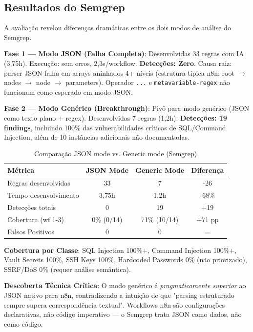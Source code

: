 \documentclass[12pt,a4paper]{article}
\begin{document}
\subsection{Resultados do Semgrep}

A avaliação revelou diferenças dramáticas entre os dois modos de análise do Semgrep.

\textbf{Fase 1 — Modo JSON (Falha Completa)}: Desenvolvidas 33 regras com IA (3,75h). Execução: sem erros, 2,3s/workflow. \textbf{Detecções: Zero}. Causa raiz: parser JSON falha em arrays aninhados 4+ níveis (estrutura típica n8n: root $\rightarrow$ nodes $\rightarrow$ node $\rightarrow$ parameters). Operador \texttt{...} e \texttt{metavariable-regex} não funcionam como esperado em modo JSON.

\textbf{Fase 2 — Modo Genérico (Breakthrough)}: Pivô para modo genérico (JSON como texto plano + regex). Desenvolvidas 7 regras (1,2h). \textbf{Detecções: 19 findings}, incluindo 100\% das vulnerabilidades críticas de SQL/Command Injection, além de 10 instâncias adicionais não documentadas.

\begin{table}[H]
\centering
\caption{Comparação JSON mode vs. Generic mode (Semgrep)}
\label{tab:mode-comparison}
\begin{tabular}{@{}lccc@{}}
\toprule
\textbf{Métrica} & \textbf{JSON Mode} & \textbf{Generic Mode} & \textbf{Diferença} \\ \midrule
Regras desenvolvidas & 33 & 7 & -26 \\
Tempo desenvolvimento & 3,75h & 1,2h & -68\% \\
Detecções totais & 0 & 19 & +19 \\
Cobertura (wf 1-3) & 0\% (0/14) & 71\% (10/14) & +71 pp \\
Falsos Positivos & 0 & 0 & = \\
\bottomrule
\end{tabular}
\end{table}

\textbf{Cobertura por Classe}: SQL Injection 100\%+, Command Injection 100\%+, Vault Secrets 100\%, SSH Keys 100\%, Hardcoded Passwords 0\% (não priorizado), SSRF/DoS 0\% (requer análise semântica).

\textbf{Descoberta Técnica Crítica}: O modo genérico é \textit{pragmaticamente superior} ao JSON nativo para n8n, contradizendo a intuição de que "parsing estruturado sempre supera correspondência textual". Workflows n8n são configurações declarativas, não código imperativo — o Semgrep trata JSON como dados, não como código.
\end{document}
